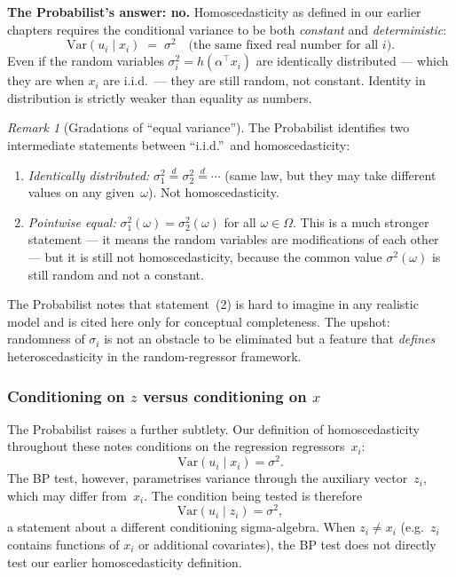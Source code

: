 \documentclass[a4paper,oneside,12pt]{extarticle}
\theoremstyle{plain}
\theoremstyle{definition}
\theoremstyle{remark}
\newtheorem{remark}[proposition]{Remark}
\newcommand*{\Var}{\mathrm{Var}}
\begin{document}
\textbf{The Probabilist's answer: no.}  Homoscedasticity as defined in our
earlier chapters requires the conditional variance to be both
\emph{constant} and \emph{deterministic}:
\[
  \Var(u_i \mid x_i) \;=\; \sigma^2
  \quad \text{(the same fixed real number for all }i\text{).}
\]
Even if the random variables $\sigma_i^2 = h(\alpha^\top x_i)$ are
identically distributed — which they are when $x_i$ are i.i.d.\ —
they are still random, not constant.  Identity in distribution is
strictly weaker than equality as numbers.

\begin{remark}[Gradations of ``equal variance'']
The Probabilist identifies two intermediate statements between ``i.i.d.''\
and homoscedasticity:
\begin{enumerate}
\item \emph{Identically distributed:}
  $\sigma_1^2 \overset{d}{=} \sigma_2^2 \overset{d}{=} \cdots$
  (same law, but they may take different values on any given~$\omega$).
  Not homoscedasticity.
\item \emph{Pointwise equal:}
  $\sigma_1^2(\omega) = \sigma_2^2(\omega)$ for all $\omega \in \Omega$.
  This is a much stronger statement — it means the random variables
  are modifications of each other — but it is still not
  homoscedasticity, because the common value $\sigma^2(\omega)$ is
  still random and not a constant.
\end{enumerate}
The Probabilist notes that statement~(2) is hard to imagine in any realistic
model and is cited here only for conceptual completeness.
The upshot: randomness of $\sigma_i$ is not an obstacle to be
eliminated but a feature that \emph{defines} heteroscedasticity in
the random-regressor framework.
\end{remark}

\subsubsection*{Conditioning on $z$ versus conditioning on $x$}

The Probabilist raises a further subtlety.  Our definition of homoscedasticity
throughout these notes conditions on the regression regressors~$x_i$:
\[
  \Var(u_i \mid x_i) = \sigma^2.
\]
The BP test, however, parametrises variance through the auxiliary
vector~$z_i$, which may differ from~$x_i$.  The condition being
tested is therefore
\[
  \Var(u_i \mid z_i) = \sigma^2,
\]
a statement about a different conditioning sigma-algebra.  When
$z_i \neq x_i$ (e.g.\ $z_i$ contains functions of $x_i$ or
additional covariates), the BP test does not directly test our
earlier homoscedasticity definition.
\end{document}
